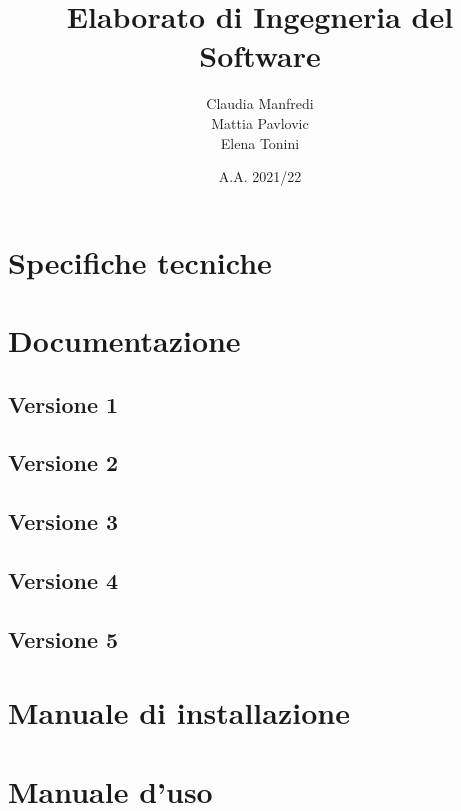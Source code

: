 \documentclass{report}
\title{Elaborato di Ingegneria del Software}
\author{Claudia Manfredi\\Mattia Pavlovic\\Elena Tonini}
\date{A.A. 2021/22}
\begin{document}
\maketitle
\tableofcontents

\chapter{Specifiche tecniche}


\chapter{Documentazione}

\section{Versione 1}





\cleardoublepage
\section{Versione 2}





\cleardoublepage
\section{Versione 3}





\cleardoublepage
\section{Versione 4}





\cleardoublepage
\section{Versione 5}





\chapter{Manuale di installazione}


\chapter{Manuale d'uso}

\end{document}
